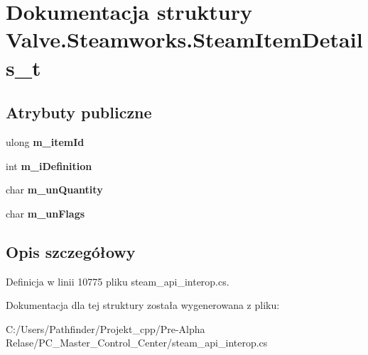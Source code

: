 \hypertarget{struct_valve_1_1_steamworks_1_1_steam_item_details__t}{}\section{Dokumentacja struktury Valve.\+Steamworks.\+Steam\+Item\+Details\+\_\+t}
\label{struct_valve_1_1_steamworks_1_1_steam_item_details__t}
\subsection*{Atrybuty publiczne}
\begin{DoxyCompactItemize}
\item 
\mbox{\label{struct_valve_1_1_steamworks_1_1_steam_item_details__t_a7b0c6f0da3edd1f349e671b3a19fbefc}} 
ulong {\bfseries m\+\_\+item\+Id}
\item 
\mbox{\label{struct_valve_1_1_steamworks_1_1_steam_item_details__t_a08c8cd84c0344f6af5ebb35ad33df718}} 
int {\bfseries m\+\_\+i\+Definition}
\item 
\mbox{\label{struct_valve_1_1_steamworks_1_1_steam_item_details__t_a58fc95aecc152729939800c21c77b153}} 
char {\bfseries m\+\_\+un\+Quantity}
\item 
\mbox{\label{struct_valve_1_1_steamworks_1_1_steam_item_details__t_a8cb0fb90938826e815643cae4bb2971c}} 
char {\bfseries m\+\_\+un\+Flags}
\end{DoxyCompactItemize}


\subsection{Opis szczegółowy}


Definicja w linii 10775 pliku steam\+\_\+api\+\_\+interop.\+cs.



Dokumentacja dla tej struktury została wygenerowana z pliku\+:\begin{DoxyCompactItemize}
\item 
C\+:/\+Users/\+Pathfinder/\+Projekt\+\_\+cpp/\+Pre-\/\+Alpha Relase/\+P\+C\+\_\+\+Master\+\_\+\+Control\+\_\+\+Center/steam\+\_\+api\+\_\+interop.\+cs\end{DoxyCompactItemize}
